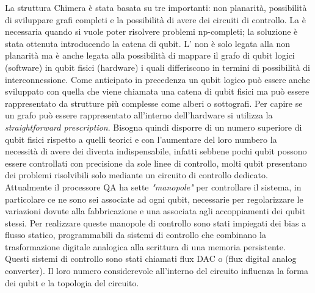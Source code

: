 La struttura Chimera è stata basata su tre  importanti: non planarità, possibilità di sviluppare grafi completi e la possibilità di avere dei circuiti di controllo. La  è necessaria quando si vuole poter risolvere problemi np-completi; la soluzione è stata ottenuta introducendo la catena di qubit. L' non è solo legata alla non planarità ma è anche legata alla possibilità di mappare il grafo di qubit logici (software) in qubit fisici (hardware) i quali differiscono in termini di possibilità di interconnessione. Come anticipato in precedenza un qubit logico può essere anche sviluppato con quella che viene chiamata una catena di qubit fisici ma può essere rappresentato da strutture più complesse come alberi o sottografi. Per capire se un grafo può essere rappresentato all'interno dell'hardware si utilizza la \textit{straightforward prescription}. Bisogna quindi disporre di un numero superiore di qubit fisici rispetto a quelli teorici e con l'aumentare del loro numbero la necessità di avere dei  diventa indispensabile, infatti sebbene pochi qubit possono essere controllati con precisione da sole linee di controllo, molti qubit presentano dei problemi risolvibili solo mediante un circuito di controllo dedicato. Attualmente il processore QA ha sette \textit{"manopole"} per controllare il sistema, in particolare ce ne sono sei associate ad ogni qubit, necessarie per regolarizzare le variazioni dovute alla fabbricazione e una associata agli accoppiamenti dei qubit stessi. Per realizzare queste manopole di controllo sono stati impiegati dei bias a flusso statico, programmabili da sistemi di controllo che combinano la trasformazione digitale analogica alla scrittura di una memoria persistente. Questi sistemi di controllo sono stati chiamati flux DAC o  (flux digital analog converter). Il loro numero considerevole all'interno del circuito influenza la forma dei qubit e la topologia del circuito.

